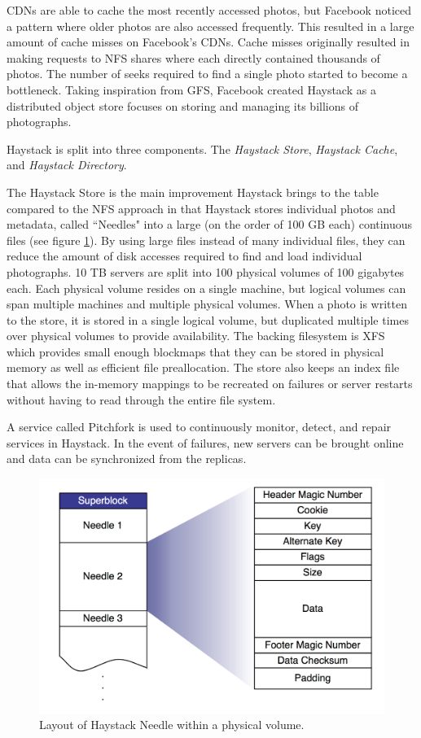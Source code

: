 \documentclass[]{article}
\begin{document}
CDNs are able to cache the most recently accessed photos, but Facebook noticed a pattern where older photos are also accessed frequently. This resulted in a large amount of cache misses on Facebook's CDNs. Cache misses originally resulted in making requests to NFS shares where each directly contained thousands of photos. The number of seeks required to find a single photo started to become a bottleneck. Taking inspiration from GFS, Facebook created Haystack as a distributed object store focuses on storing and managing its billions of photographs.

Haystack is split into three components. The \textit{Haystack Store}, \textit{Haystack Cache}, and \textit{Haystack Directory}.

The Haystack Store is the main improvement Haystack brings to the table compared to the NFS approach in that Haystack stores individual photos and metadata, called ``Needles" into a large (on the order of 100 GB each) continuous files (see figure \ref{fig:haystack}). By using large files instead of many individual files, they can reduce the amount of disk accesses required to find and load individual photographs. 10 TB servers are split into 100 physical volumes of 100 gigabytes each. Each physical volume resides on a single machine, but logical volumes can span multiple machines and multiple physical volumes. When a photo is written to the store, it is stored in a single logical volume, but duplicated multiple times over physical volumes to provide availability. The backing filesystem is XFS which provides small enough blockmaps that they can be stored in physical memory as well as efficient file preallocation. The store also keeps an index file that allows the in-memory mappings to be recreated on failures or server restarts without having to read through the entire file system.

A service called Pitchfork is used to continuously monitor, detect, and repair services in Haystack. In the event of failures, new servers can be brought online and data can be synchronized from the replicas.

\begin{figure}
	\centering
	\includegraphics[width=1.0\linewidth]{img/haystack}
	\caption[Haystack individual file layout.]{Layout of Haystack Needle within a physical volume.\cite{beaver_finding_2010}}
	\label{fig:haystack}
\end{figure}
\end{document}
